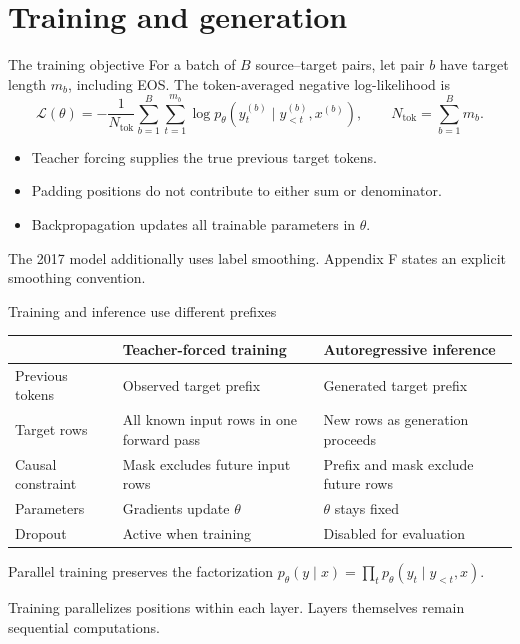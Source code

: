 \documentclass[aspectratio=169,11pt]{beamer}
\newcommand{\src}[1]{\par\vfill{\fontsize{7}{8.5}\selectfont\color{muted}#1}\par}
\begin{document}
\section{Training and generation}
\begin{frame}[t]{The training objective}
For a batch of $B$ source--target pairs, let pair $b$ have target length
$m_b$, including EOS. The token-averaged negative log-likelihood is
\[
 \mathcal L(\theta)=
 -\frac{1}{N_{\mathrm{tok}}}
 \sum_{b=1}^{B}\sum_{t=1}^{m_b}
 \log p_\theta\!\left(y_t^{(b)}\mid y_{<t}^{(b)},x^{(b)}\right),
 \qquad N_{\mathrm{tok}}=\sum_{b=1}^{B}m_b.
\]
\begin{itemize}
  \item Teacher forcing supplies the true previous target tokens.
  \item Padding positions do not contribute to either sum or denominator.
  \item Backpropagation updates all trainable parameters in $\theta$.
\end{itemize}
\src{The 2017 model additionally uses label smoothing. Appendix F states an explicit smoothing convention.}
\end{frame}

\begin{frame}[t]{Training and inference use different prefixes}
\small
\begin{tabularx}{\textwidth}{@{}lXX@{}}
\toprule
 & Teacher-forced training & Autoregressive inference \\
\midrule
Previous tokens & Observed target prefix & Generated target prefix \\
Target rows & All known input rows in one forward pass & New rows as generation proceeds \\
Causal constraint & Mask excludes future input rows & Prefix and mask exclude future rows \\
Parameters & Gradients update $\theta$ & $\theta$ stays fixed \\
Dropout & Active when training & Disabled for evaluation \\
\bottomrule
\end{tabularx}
\vspace{3mm}
\normalsize
Parallel training preserves the factorization
$p_\theta(y\mid x)=\prod_t p_\theta(y_t\mid y_{<t},x)$.
\src{Training parallelizes positions within each layer. Layers themselves remain sequential computations.}
\end{frame}
\end{document}
